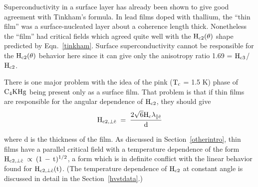 	 Superconductivity  in  a surface layer  has  already been shown to
give good  agreement with Tinkham's  formula.  In   lead  films doped  with
thallium, the ``thin film'' was a surface-nucleated layer about a coherence
length thick.\cite{tinkham64}  Nonetheless the ``film'' had critical fields
which agreed quite  well with the  $\rm H_{c2}(\theta)$ shape predicted  by
Eqn.~\ref{tinkham}.   Surface  superconductivity cannot be  responsible for
the  $\rm   H_{c2}(\theta)$ behavior  here   since it  can   give  only the
anisotropy ratio 1.69 = $\rm H_{c3}$/$\rm H_{c2}$.\cite{tinkham64}

	There is one major problem with the  idea of the  pink ($\rm T_c$ =
1.5 K) phase of $\rm  C_4KHg$ being present  only as a  surface film.  That
problem is that if thin films are responsible for the angular dependence of
$\rm H_{c2}$, they should give\cite{tinkham80}\\

\[ 
\rm H_{c2, \perp \hat{c}} \; = \; \frac{2 \sqrt{6} H_c \lambda_{\parallel \hat{c}}}{d}
\]

\noindent where d is the thickness of the film.  As discussed in
Section~\ref{otherintro}, thin films have  a parallel critical field with a
temperature dependence of the form $\rm H_{c2, \perp \hat{c}} \: \propto \:
(1 \, - \, t)^{1/2}$, a form which is in definite conflict  with the linear
behavior  found   for $\rm  H_{c2,   \perp \hat{c}}(t)$.  (The  temperature
dependence of $\rm H_{c2}$ at constant angle is discussed  in detail in the
Section~\ref{hvstdata}.)

